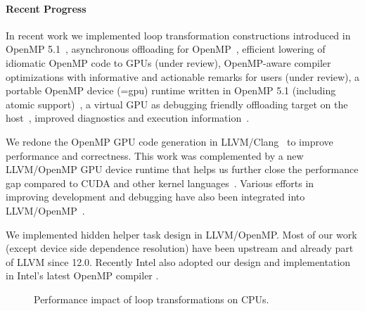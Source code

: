 \paragraph{Recent Progress}
In recent work we implemented loop transformation constructions introduced in OpenMP 5.1~\cite{kruse2021openmpbooth,kruse2021clangast}, asynchronous offloading for OpenMP~\cite{thiddenhelper}, efficient lowering of idiomatic OpenMP code to GPUs (under review),  OpenMP-aware compiler optimizations with informative and actionable remarks for users (under review), a portable OpenMP device (=gpu) runtime written in OpenMP 5.1 (including atomic support)~\cite{DBLP:conf/iwomp/TianCDC21}, a virtual GPU as debugging friendly
offloading target on the host~\cite{DBLP:conf/icppw/PatelTDC21}, improved diagnostics and execution information~\cite{DBLP:conf/icppw/DoerfertHC21,DBLP:conf/iwomp/HuberWGDH21}.

We redone the OpenMP GPU code generation in LLVM/Clang~\cite{OpenMPEncoding} to improve performance and correctness.
This work was complemented by a new LLVM/OpenMP GPU device runtime that helps us further close the performance gap compared to CUDA and other kernel languages~\cite{NewOpenMPRT}.
Various efforts in improving development and debugging have also been integrated into LLVM/OpenMP~\cite{DBLP:conf/icppw/DoerfertHC21,DBLP:conf/icppw/PatelTDC21}.

We implemented hidden helper task design in LLVM/OpenMP.
Most of our work \cite{DBLP:conf/iwomp/TianCDC21} (except device side dependence resolution) have been upstream and already part of LLVM since 12.0.
Recently Intel also adopted our design and implementation in Intel's latest OpenMP compiler \cite{TianUpdateOnIntelCompiler2021}.

\begin{figure}[tb]
\centering
{}%
\caption{Performance impact of loop transformations on CPUs.}
\label{fig:unrolltile}
\end{figure}

